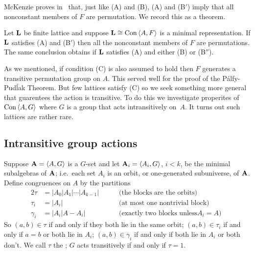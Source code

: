 McKenzie proves in~\cite{McKenzie1983} that, just like (A) and (B),
(A) and (B$'$) imply that all nonconstant members of $F$ are
permutation. We record this as a theorem.

\begin{theorem}
Let $\mathbf{L}$ be finite lattice and suppose $\mathbf{L} \cong \operatorname{Con\,} \langle A,F\rangle$
is a minimal representation. If $\mathbf{L}$ satisfies \textup{(A)} and
\textup{(B$'$)} then
all the nonconstant members of $F$ are permutations. 
The same conclusion obtains if 
$\mathbf{L}$ satisfies \textup{(A)} and either \textup{(B)} or
\textup{(B$''$)}.
\end{theorem}

As we mentioned, if condition (C) is also assumed to hold then
$F$ generates a transitive permutation group on $A$. 
This served well for the proof of the P\'alfy-Pud\'lak Theorem. 
But few lattices satisfy (C) so we seek something more general
that guarentees the action is transitive. To do this we investigate 
properites of $\operatorname{Con\,} \langle A,G\rangle$ where $G$ is a group that acts
intransitively on~$A$. It turns out such lattices are rather rare.

\subsection{Intransitive group actions} 
Suppose $\mathbf{A} = \langle A,G\rangle$ is a $G$-set and let $\mathbf{A}_i = \langle A_i, G\rangle$, $i < k$,
be the minimal subalgebras of $\mathbf{A}$; i.e.~each set $A_i$ is an orbit, or
one-generated subuniverse, of $\mathbf{A}$. Define congruences on $A$ by the 
partitions
\begin{alignat*}{2}
\tau &= |A_0|A_1|\cdots|A_{k-1}| &&\quad\text{ (the blocks are the orbits)} \\
\tau_i &= |A_i| &&\quad\text{ (at most one nontrivial block) }\\
\gamma_i &= |A_i|A - A_i| &&\quad\text{ (exactly two blocks unless
$A_i = A$) }
\end{alignat*}
So $(a,b) \in \tau$ if and only if they both lie in the same orbit;
$(a,b) \in \tau_i$ if and only if $a = b$ or both lie in $A_i$;
$(a,b) \in \gamma_i$ if and only if both lie in $A_i$ or both don't.
We call $\tau$ the ; $G$ acts transitively
if and only if $\tau = 1$. 

